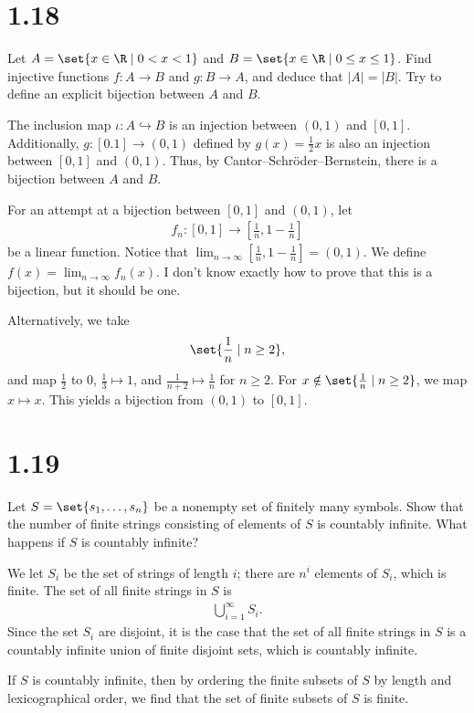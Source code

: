 \documentclass[10pt]{mypackage}
\begin{document}
\section{1.18}%
\begin{problem}
  Let $A = \set{x\in\R\mid 0 < x < 1}$ and $B = \set{x\in\R\mid 0\leq x \leq 1}$. Find injective functions $f: A\rightarrow B$ and $g: B\rightarrow A$, and deduce that $|A| = |B|$. Try to define an explicit bijection between $A$ and $B$.
\end{problem}
\begin{solution}
  The inclusion map $\iota: A\hookrightarrow B$ is an injection between $(0,1)$ and $[0,1]$. Additionally, $g: [0.1]\rightarrow (0,1)$ defined by $g(x) = \frac{1}{2}x$ is also an injection between $[0,1]$ and $(0,1)$. Thus, by Cantor--Schröder--Bernstein, there is a bijection between $A$ and $B$.\newline

  For an attempt at a bijection between $[0,1]$ and $(0,1)$, let
  \begin{align*}
    f_n: [0,1]\rightarrow \left[\frac{1}{n},1-\frac{1}{n}\right]
  \end{align*}
  be a linear function. Notice that $\lim_{n\rightarrow\infty}\left[\frac{1}{n},1-\frac{1}{n}\right] = (0,1)$. We define $f(x) = \lim_{n\rightarrow\infty}f_n(x)$. I don't know exactly how to prove that this is a bijection, but it should be one.\newline

  Alternatively, we take
  \begin{align*}
    \set{\frac{1}{n}\mid n\geq 2},
  \end{align*}
  and map $\frac{1}{2}$ to $0$, $\frac{1}{3}\mapsto 1$, and $\frac{1}{n+2} \mapsto \frac{1}{n}$ for $n\geq 2$. For $x\notin \set{\frac{1}{n}\mid n\geq 2}$, we map $x\mapsto x$. This yields a bijection from $\left(0,1\right)$ to $\left[0,1\right]$.
\end{solution}
\section{1.19}%
\begin{problem}
  Let $S = \set{s_1,\dots,s_n}$ be a nonempty set of finitely many symbols. Show that the number of finite strings consisting of elements of $S$ is countably infinite. What happens if $S$ is countably infinite?
\end{problem}
\begin{solution}
  We let $S_i$ be the set of strings of length $i$; there are $n^i$ elements of $S_i$, which is finite. The set of all finite strings in $S$ is
  \begin{align*}
    \bigcup_{i=1}^{\infty}S_i.
  \end{align*}
  Since the set $S_i$ are disjoint, it is the case that the set of all finite strings in $S$ is a countably infinite union of finite disjoint sets, which is countably infinite.\newline

  If $S$ is countably infinite, then by ordering the finite subsets of $S$ by length and lexicographical order, we find that the set of finite subsets of $S$ is finite.
\end{solution}
\end{document}
